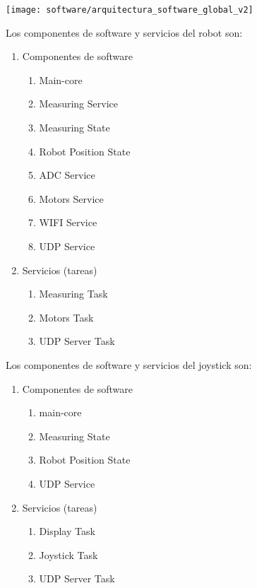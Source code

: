 \begin{center}
\texttt{[image: software/arquitectura\_software\_global\_v2]}
  \label{fig:arquitectura_software_global}

\end{center}

Los componentes de software y servicios del robot son:

\begin{enumerate}	
	\item Componentes de software
	\begin{enumerate}			
		\item Main-core
		\item Measuring Service	
		\item Measuring State
		\item Robot Position State
		\item ADC Service
		\item Motors Service
		\item WIFI Service
		\item UDP Service	
	\end{enumerate}	
	\item Servicios (tareas)
	\begin{enumerate}				
		\item Measuring Task		
		\item Motors Task	
		\item UDP Server Task
	\end{enumerate}			
\end{enumerate}		


Los componentes de software y servicios del joystick son:

\begin{enumerate}	
	\item Componentes de software
	\begin{enumerate}			
		\item main-core
		\item Measuring State
		\item Robot Position State
		\item UDP Service	
	\end{enumerate}	
	\item Servicios (tareas)
	\begin{enumerate}				
		\item Display Task		
		\item Joystick Task	
		\item UDP Server Task
	\end{enumerate}			
\end{enumerate}		

